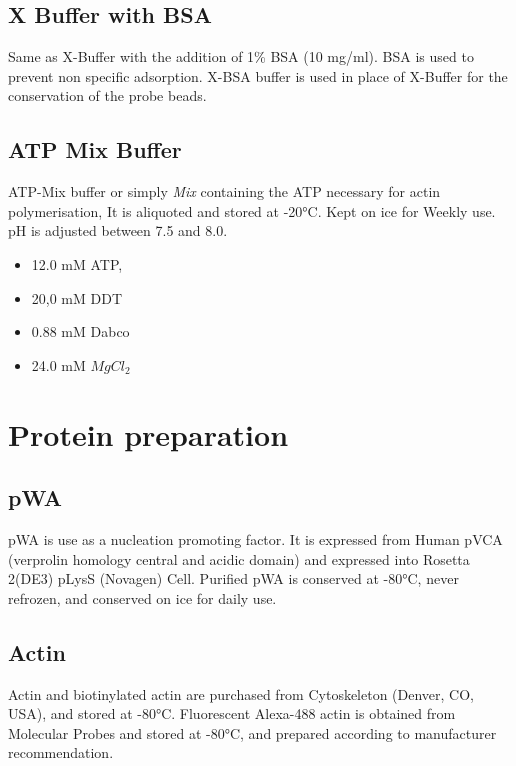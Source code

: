 \documentclass[A4paperpaper,11pt,english]{sphinxmanual}
\begin{document}
\subsection{X Buffer with BSA}
\label{parts/part2:x-buffer-with-bsa}
Same as X-Buffer with the addition of 1\% BSA (10 mg/ml). BSA is used to prevent
non specific adsorption. X-BSA buffer is used  in place of X-Buffer for
the conservation of the probe beads.


\subsection{ATP Mix Buffer}
\label{parts/part2:atp-mix-buffer}\label{parts/part2:id1}
ATP-Mix buffer or simply \emph{Mix} containing the ATP necessary for actin
polymerisation,  It is aliquoted and stored at -20°C. Kept on ice for Weekly use. pH is adjusted between 7.5 and 8.0.
\begin{itemize}
\item {} 
12.0 mM ATP,

\item {} 
20,0 mM DDT

\item {} 
0.88 mM Dabco

\item {} 
24.0 mM \(MgCl_2\)

\end{itemize}


\section{Protein preparation}
\label{parts/part2:protein-preparation}

\subsection{pWA}
\label{parts/part2:pwa}
pWA is use as a nucleation promoting factor. It is expressed from Human pVCA
(verprolin homology central and acidic domain) and expressed into Rosetta
2(DE3) pLysS (Novagen) Cell.  Purified pWA is conserved at -80°C, never
refrozen, and conserved on ice for daily use.


\subsection{Actin}
\label{parts/part2:actin}
Actin and biotinylated actin are purchased from Cytoskeleton (Denver, CO, USA), and stored at -80°C.
Fluorescent Alexa-488 actin is obtained from Molecular Probes and stored at -80°C, and prepared according to manufacturer recommendation.
\end{document}
